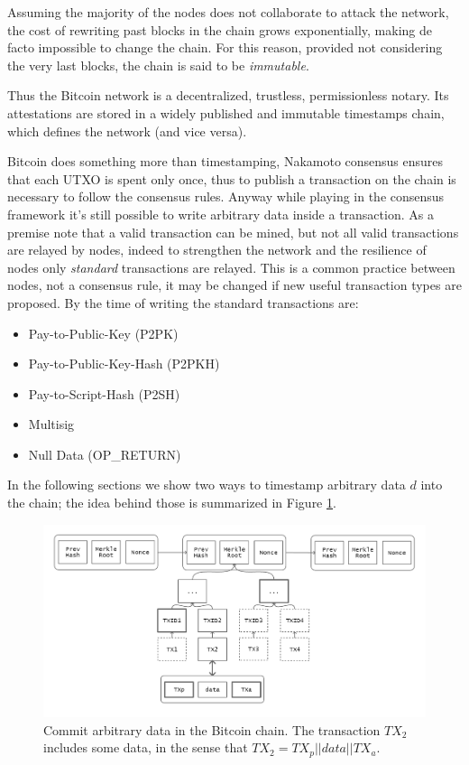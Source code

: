 Assuming the majority of the nodes does not collaborate to attack the network, the cost of rewriting past blocks in the chain grows exponentially, making de facto impossible to change the chain. For this reason, provided not considering the very last blocks, the chain is said to be \textit{immutable}. 

Thus the Bitcoin network is a decentralized, trustless, permissionless notary. Its attestations are stored in a widely published and immutable timestamps chain, which defines the network (and vice versa). 

Bitcoin does something more than timestamping, Nakamoto consensus ensures that each UTXO is spent only once, thus to publish a transaction on the chain is necessary to follow the consensus rules. 
Anyway while playing in the consensus framework it's still possible to write arbitrary data inside a transaction.
As a premise note that a valid transaction can be mined, but not all valid transactions are relayed by nodes, indeed to strengthen the network and the resilience of nodes only \textit{standard} transactions are relayed. This is a common practice between nodes, not a consensus rule, it may be changed if new useful transaction types are proposed. By the time of writing the standard transactions are:
\begin{itemize}
	\item Pay-to-Public-Key (P2PK)
	\item Pay-to-Public-Key-Hash (P2PKH)
	\item Pay-to-Script-Hash (P2SH)
	\item Multisig
	\item Null Data (OP\_RETURN)
\end{itemize}

In the following sections we show two ways to timestamp arbitrary data $d$ into the chain; the idea behind those is summarized in Figure \ref{fig:chain-data}.

\begin{figure}
	\begin{center}
		\includegraphics[width=\linewidth]{Images/bitcoin-chain-data-path.png}
		\caption[Commit arbitrary data in the Bitcoin chain.]{Commit arbitrary data in the Bitcoin chain. The transaction $TX_2$ includes some data, in the sense that $TX_2=TX_p||data||TX_a$.}
		\label{fig:chain-data}
	\end{center}
\end{figure}

